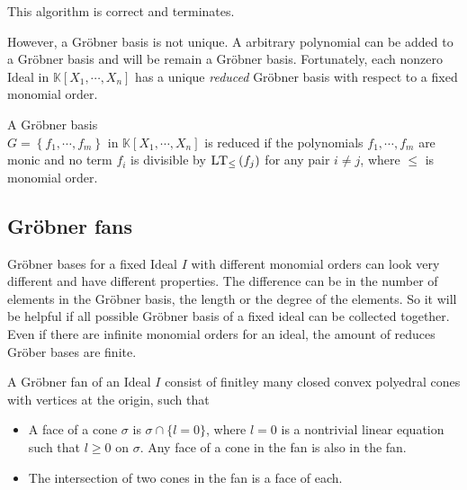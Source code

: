 This algorithm is correct and terminates.\cite{KHZ}

\newpage

However, a Gröbner basis is not unique. A arbitrary polynomial can be added to a Gröbner basis and will be remain a Gröbner basis.
Fortunately, each nonzero Ideal in $\mathbb{K}\left[X_{1}, \cdots, X_{n}\right]$ has a unique \textit{reduced} Gröbner basis with respect to a fixed monomial order.

\begin{env_definition}
\cite{KHZ}
A Gröbner basis \\ $G= \left\lbrace  f_{1}, \cdots , f_{m} \right\rbrace  $ in 
$ \mathbb{K}\left[X_{1}, \cdots, X_{n}\right] $ is reduced if the polynomials $f_{1},\cdots , f_{m} $ are monic and no term $f_{i}$ is divisible by $ \textsc{LT}_{\leq }\left( f_{j}\right)$ for any pair $i\neq j$, where $\leq$ is monomial order.
\end{env_definition}


\subsection{Gröbner fans}
\label{subsec:Groebnerfan}
 Gröbner bases for a fixed Ideal $I$ with different monomial orders can look very different and have different properties. The difference can be in the number of elements in the Gröbner basis, the length or the degree of the elements. So it will be helpful if all 
possible Gröbner basis of a fixed ideal can be collected together.\\
Even if there are infinite monomial orders for an ideal, the amount of reduces Gröber bases are finite. \cite{coxOshea}
 
\begin{env_definition}
\cite{coxOshea} A Gröbner fan of an Ideal $I$ consist of finitley many closed convex polyedral cones with vertices at the origin, such that

\begin{itemize}
\item
A face of a cone $\sigma$ is $\sigma \cap \lbrace l=0\rbrace$, where $l=0$ is a nontrivial linear equation such that $l \geq 0$ on $\sigma$.
Any face of a cone in the fan is also in the fan.
\item
The intersection of two cones in the fan is a face of each.
\end{itemize}

\end{env_definition}

